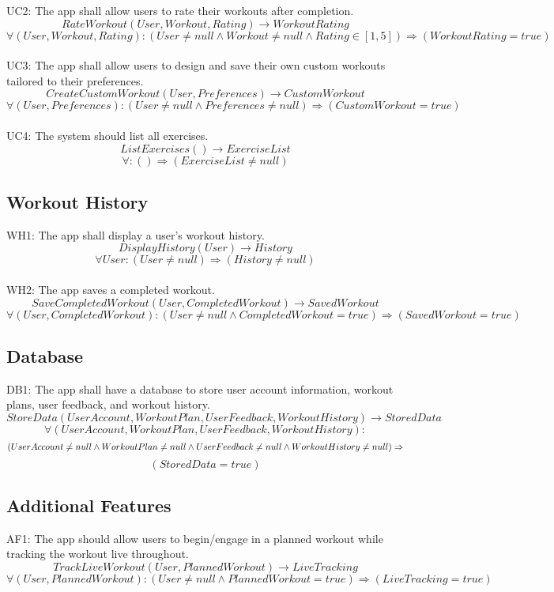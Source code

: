 \documentclass[12pt]{article}
\begin{document}
UC2: The app shall allow users to rate their workouts after completion.
\[RateWorkout(User, Workout, Rating) \rightarrow WorkoutRating \]
\[ \forall (User, Workout, Rating):(User \neq null \land Workout \neq null \land Rating \in [1,5]) \Rightarrow (WorkoutRating = true) \]\\

UC3: The app shall allow users to design and save their own custom workouts tailored to their preferences.
\[CreateCustomWorkout(User, Preferences) \rightarrow CustomWorkout \]
\[ \forall (User, Preferences):(User \neq null \land Preferences \neq null) \Rightarrow (CustomWorkout = true) \]\\

UC4: The system should list all exercises.
\[ListExercises() \rightarrow ExerciseList \]
\[ \forall : () \Rightarrow (ExerciseList \neq null) \]

\subsection{Workout History}
WH1: The app shall display a user’s workout history.
\[DisplayHistory(User) \rightarrow History \]
\[ \forall User: (User \neq null) \Rightarrow (History \neq null) \]\\

WH2: The app saves a completed workout.
\[SaveCompletedWorkout(User, CompletedWorkout) \rightarrow SavedWorkout \]
\[ \forall (User, CompletedWorkout): (User \neq null \land CompletedWorkout = true) \Rightarrow (SavedWorkout = true) \]

\subsection{Database}
DB1: The app shall have a database to store user account information, workout plans, user feedback, and workout history.
\[StoreData(UserAccount, WorkoutPlan, UserFeedback, WorkoutHistory) \rightarrow StoredData \]
\[ \forall (UserAccount, WorkoutPlan, UserFeedback, WorkoutHistory):\] 
\[(UserAccount \neq null \land WorkoutPlan \neq null \land UserFeedback \neq null \land WorkoutHistory \neq null) \\
\Rightarrow\] \[(StoredData = true) \]

\subsection{Additional Features}
AF1: The app should allow users to begin/engage in a planned workout while tracking the workout live throughout.
\[TrackLiveWorkout(User, PlannedWorkout) \rightarrow LiveTracking \]
\[ \forall (User, PlannedWorkout): (User \neq null \land PlannedWorkout = true) \Rightarrow (LiveTracking = true) \]\\
\end{document}
